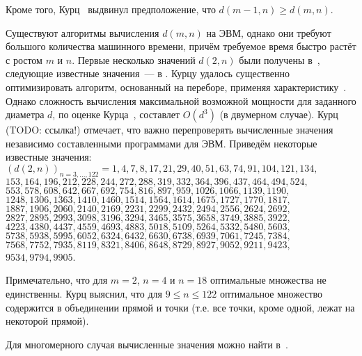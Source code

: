 Кроме того, Курц~\cite{kurz2008bounds} выдвинул предположение, что $d(m - 1, n) \geq d(m, n)$.




Существуют алгоритмы вычисления $d(m,n)$ на ЭВМ, однако они требуют большого количества машинного времени,
причём требуемое время быстро растёт с ростом $m$ и $n$.
Первые несколько значений $d(2,n)$ были получены в~\cite{harborth1998integral},
следующие известные значения~--- в \cite{kurz2005characteristic,kurz2006konstruktion,kurz2008minimum,kurz2008bounds,our-mz-rus}.
Курцу удалось существенно оптимизировать алгоритм, основанный на переборе, применяя характеристику~\cite{kurz2005characteristic,kreisel2008heptagon}.
Однако сложность вычисления максимальной возможной мощности для заданного диаметра $d$, по оценке Курца~\cite{kreisel2008heptagon},
составлет $O(d^3)$ (в двумерном случае).
Курц (TODO: ссылка!) отмечает, что важно перепроверять вычисленные значения независимо составленными программами для ЭВМ.
Приведём некоторые известные значения:
\\
$
(d(2, n))_{n=3,...,122} = 1, 4, 7, 8, 17, 21, 29, 40, 51, 63, 74, 91, 104, 121,
134, $\\$153, 164,
196, 212, 228, 244, 272, 288, 319, 332, 364, 396, 437, 464, 494, 524,$\\$ 553, 578, 608,
642, 667, 692, 754, 816, 897, 959, 1026, 1066, 1139, 1190, $\\$ 1248, 1306, 1363, 1410,
1460, 1514, 1564, 1614, 1675, 1727, 1770, 1817, $\\$1887, 1906, 2060, 2140, 2169,
2231, 2299, 2432, 2494, 2556, 2624, 2692, $\\$2827, 2895, 2993, 3098, 3196, 3294,
3465, 3575, 3658, 3749, 3885, 3922, $\\$4223, 4380, 4437, 4559, 4693, 4883,
5018, 5109, 5264, 5332, 5480, 5603, $\\$5738, 5938, 5995, 6052,
6324, 6432, 6630, 6738, 6939, 7061, 7245, 7384, $\\$7568, 7752, 7935, 8119, 8321,
8406, 8648, 8729, 8927, 9052, 9211, 9423, $\\$9534, 9794, 9905
$.

Примечательно, что для $m=2$, $n=4$ и $n=18$ оптимальные множества не единственны.
Курц выяснил, что для $9 \leq n \leq 122$ оптимальное множество содержится
в объединении прямой и точки (т.е. все точки, кроме одной, лежат на некоторой прямой).

Для многомерного случая вычисленные значения можно найти в~\cite{kurz2008bounds}.


